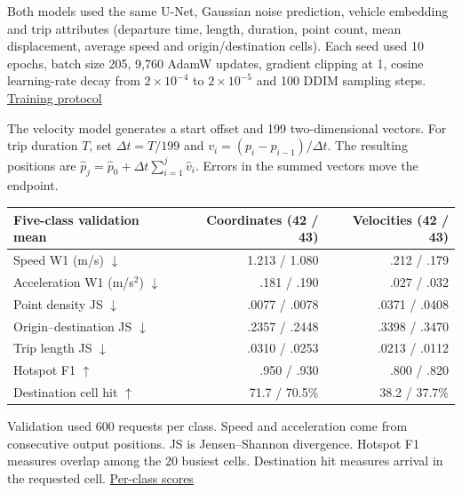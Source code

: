 \documentclass[11pt,a4paper]{article}
\newcommand{\record}[2]{\href{https://github.com/LiuJingting0201/cnr-road-gaf-diffusion/blob/main/docs/results/#1}{#2}}
\begin{document}
Both models used the same U-Net, Gaussian noise prediction, vehicle embedding and trip attributes (departure time, length, duration, point count, mean displacement, average speed and origin/destination cells). Each seed used 10 epochs, batch size 205, 9,760 AdamW updates, gradient clipping at 1, cosine learning-rate decay from $2\times10^{-4}$ to $2\times10^{-5}$ and 100 DDIM sampling steps. \record{velocity-class-control/PROTOCOL.md}{Training protocol}

The velocity model generates a start offset and 199 two-dimensional vectors. For trip duration $T$, set $\Delta t=T/199$ and $v_i=(p_i-p_{i-1})/\Delta t$. The resulting positions are $\hat p_j=\hat p_0+\Delta t\sum_{i=1}^j\hat v_i$. Errors in the summed vectors move the endpoint.

\newpage
\begin{center}\small
\begin{tabular}{lrr}\toprule
Five-class validation mean & Coordinates (42 / 43) & Velocities (42 / 43)\\\midrule
Speed W1 (m/s) $\downarrow$ & 1.213 / 1.080 & .212 / .179\\
Acceleration W1 (m/s$^2$) $\downarrow$ & .181 / .190 & .027 / .032\\
Point density JS $\downarrow$ & .0077 / .0078 & .0371 / .0408\\
Origin--destination JS $\downarrow$ & .2357 / .2448 & .3398 / .3470\\
Trip length JS $\downarrow$ & .0310 / .0253 & .0213 / .0112\\
Hotspot F1 $\uparrow$ & .950 / .930 & .800 / .820\\
Destination cell hit $\uparrow$ & 71.7 / 70.5\% & 38.2 / 37.7\%\\\bottomrule
\end{tabular}\end{center}

Validation used 600 requests per class. Speed and acceleration come from consecutive output positions. JS is Jensen--Shannon divergence. Hotspot F1 measures overlap among the 20 busiest cells. Destination hit measures arrival in the requested cell. \record{velocity-class-control/STATS.md}{Per-class scores}
\end{document}
